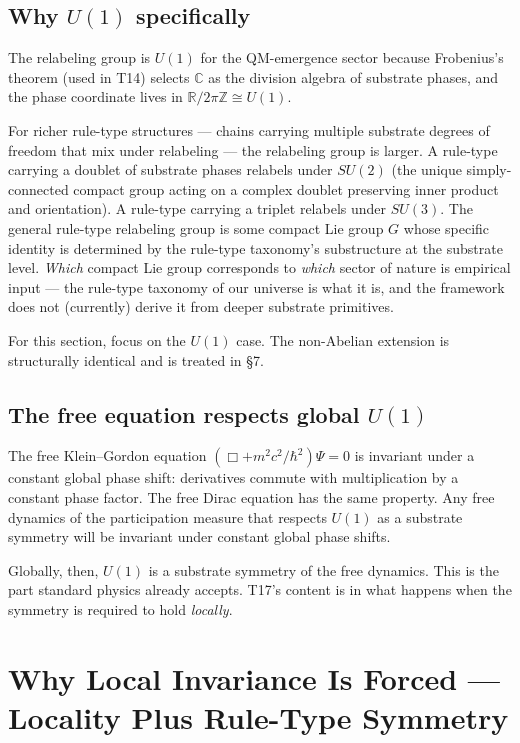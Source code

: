 \documentclass[11pt,a4paper]{article}
\begin{document}
\subsection{Why $U(1)$ specifically}

The relabeling group is $U(1)$ for the QM-emergence sector because Frobenius's theorem (used in T14) selects $\mathbb{C}$ as the division algebra of substrate phases, and the phase coordinate lives in $\mathbb{R}/2\pi\mathbb{Z} \cong U(1)$.

For richer rule-type structures --- chains carrying multiple substrate degrees of freedom that mix under relabeling --- the relabeling group is larger. A rule-type carrying a doublet of substrate phases relabels under $SU(2)$ (the unique simply-connected compact group acting on a complex doublet preserving inner product and orientation). A rule-type carrying a triplet relabels under $SU(3)$. The general rule-type relabeling group is some compact Lie group $G$ whose specific identity is determined by the rule-type taxonomy's substructure at the substrate level. \emph{Which} compact Lie group corresponds to \emph{which} sector of nature is empirical input --- the rule-type taxonomy of our universe is what it is, and the framework does not (currently) derive it from deeper substrate primitives.

For this section, focus on the $U(1)$ case. The non-Abelian extension is structurally identical and is treated in \S7.

\subsection{The free equation respects global $U(1)$}

The free Klein--Gordon equation $(\Box + m^2c^2/\hbar^2)\Psi = 0$ is invariant under a constant global phase shift: derivatives commute with multiplication by a constant phase factor. The free Dirac equation has the same property. Any free dynamics of the participation measure that respects $U(1)$ as a substrate symmetry will be invariant under constant global phase shifts.

Globally, then, $U(1)$ is a substrate symmetry of the free dynamics. This is the part standard physics already accepts. T17's content is in what happens when the symmetry is required to hold \emph{locally}.

\section{Why Local Invariance Is Forced --- Locality Plus Rule-Type Symmetry}
\end{document}
